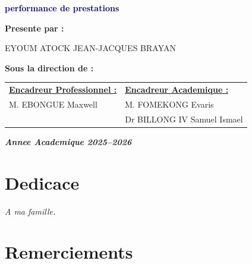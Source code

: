 \documentclass[12pt,a4paper,twoside,openany]{report}
\begin{document}
\begin{titlepage}
\begin{center}
{{{\large \textbf{\textcolor{darkblue}{performance de prestations}}}
\vspace{0.5cm}
}
}

\vspace{1.5cm}

\textbf{Presente par :}

\vspace{0.3cm}

{\large EYOUM ATOCK JEAN-JACQUES BRAYAN}

\vspace{1cm}

\textbf{Sous la direction de :}

\vspace{0.5cm}

\begin{tabular}{p{}p{}}
\underline{\textbf{Encadreur Professionnel :}} & \underline{\textbf{Encadreur Academique :}} \\
M. EBONGUE Maxwell & M. FOMEKONG Evaris \\
 & Dr BILLONG IV Samuel Ismael \\
\end{tabular}

\vfill

\textbf{\textit{Annee Academique 2025--2026}}

\end{center}
\end{titlepage}


\chapter*{Dedicace}

\vspace{5cm}

\begin{center}
\textit{\Large A ma famille.}
\end{center}

\newpage


\chapter*{Remerciements}
\end{document}

